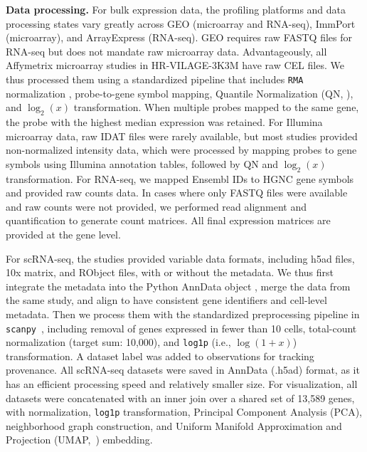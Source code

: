 \documentclass[
  12pt]{article}
\begin{document}
\noindent\textbf{Data processing.}
For bulk expression data, the profiling platforms and data processing states vary greatly across GEO (microarray and RNA-seq), ImmPort (microarray), and ArrayExpress (RNA-seq). GEO requires raw FASTQ files for RNA-seq but does not mandate raw microarray data. Advantageously, all Affymetrix microarray studies in HR-VILAGE-3K3M have raw CEL files. We thus processed them using a standardized pipeline that includes \texttt{RMA}  normalization \citep{irizarry2003summaries}, probe-to-gene symbol mapping, Quantile Normalization (QN, \citep{bolstad2003comparison}), and $\log_2(x)$ transformation. When multiple probes mapped to the same gene, the probe with the highest median expression was retained. For Illumina microarray data, raw IDAT files were rarely available, but most studies provided non-normalized intensity data, which were processed by mapping probes to gene symbols using Illumina annotation tables, followed by QN and $\log_2(x)$ transformation. For RNA-seq, we mapped Ensembl IDs to HGNC gene symbols and provided raw counts data. In cases where only FASTQ files were available and raw counts were not provided, we performed read alignment and quantification to generate count matrices. All final expression matrices are provided at the gene level. 

For scRNA-seq, the studies provided variable data formats, including h5ad files, 10x matrix, and RObject files, with or without the metadata. We thus first integrate the metadata into the Python AnnData object \citep{Virshup2024anndata}, merge the data from the same study, and align to have consistent gene identifiers and cell-level metadata. Then we process them with the standardized preprocessing pipeline in \texttt{scanpy}~\citep{wolf2018scanpy}, including removal of genes expressed in fewer than 10 cells, total-count normalization (target sum: 10,000), and \texttt{log1p} (i.e., $\log(1+x)$) transformation. A dataset label was added to observations for tracking provenance. All scRNA-seq datasets were saved in AnnData (.h5ad) format, as it has an efficient processing speed and relatively smaller size. For visualization, all datasets were concatenated with an inner join over a shared set of 13,589 genes, with normalization, \texttt{log1p} transformation, Principal Component Analysis (PCA), neighborhood graph construction, and Uniform Manifold Approximation and Projection (UMAP,~\citealp{mcinnes2018umap}) embedding.
\end{document}
